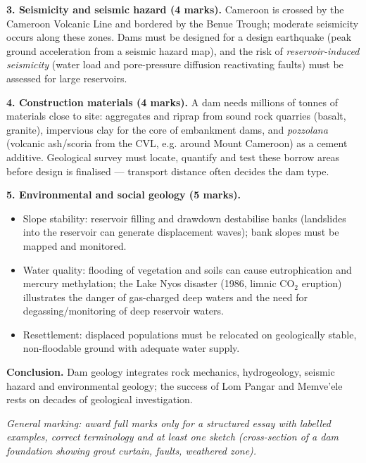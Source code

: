 \documentclass[11pt]{article}
\newcommand{\cle}[1]{{\popxbold\color{popdark}#1}}
\begin{document}
\begin{corrige}
\textbf{3. Seismicity and seismic hazard (4 marks).}
Cameroon is crossed by the \cle{Cameroon Volcanic Line} and bordered by the \cle{Benue Trough}; moderate seismicity occurs along these zones. Dams must be designed for a design earthquake (peak ground acceleration from a seismic hazard map), and the risk of \emph{reservoir-induced seismicity} (water load and pore-pressure diffusion reactivating faults) must be assessed for large reservoirs.

\textbf{4. Construction materials (4 marks).}
A dam needs millions of tonnes of materials close to site: aggregates and riprap from sound rock quarries (basalt, granite), impervious clay for the core of embankment dams, and \emph{pozzolana} (volcanic ash/scoria from the CVL, e.g. around Mount Cameroon) as a cement additive. Geological survey must locate, quantify and test these borrow areas before design is finalised --- transport distance often decides the dam type.

\textbf{5. Environmental and social geology (5 marks).}
\begin{itemize}
\item Slope stability: reservoir filling and drawdown destabilise banks (landslides into the reservoir can generate displacement waves); bank slopes must be mapped and monitored.
\item Water quality: flooding of vegetation and soils can cause eutrophication and mercury methylation; the \cle{Lake Nyos} disaster (1986, limnic CO$_2$ eruption) illustrates the danger of gas-charged deep waters and the need for degassing/monitoring of deep reservoir waters.
\item Resettlement: displaced populations must be relocated on geologically stable, non-floodable ground with adequate water supply.
\end{itemize}

\textbf{Conclusion.} Dam geology integrates rock mechanics, hydrogeology, seismic hazard and environmental geology; the success of Lom Pangar and Memve'ele rests on decades of geological investigation.\par
\emph{General marking: award full marks only for a structured essay with labelled examples, correct terminology and at least one sketch (cross-section of a dam foundation showing grout curtain, faults, weathered zone).}
\end{corrige}
\end{document}
